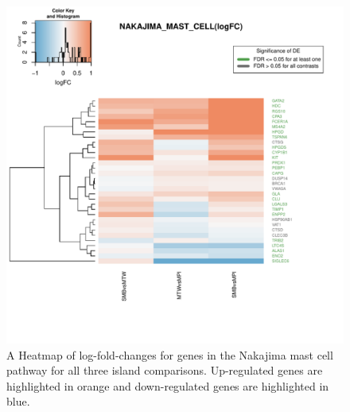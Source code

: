 \documentclass[12pt,a4paper,titlepage,twoside,openright]{book}
\begin{document}
\begin{mainmatter}
{{\begin{figure}[htb!]
\centering
\includegraphics[width=\textwidth,height=\textheight,keepaspectratio]{Figures/c2_ComparisonHeatmap_NAKAJIMA_MAST_CELL.pdf}
\caption{ A Heatmap of log-fold-changes for genes in the Nakajima mast cell pathway for all three island comparisons. Up-regulated genes are highlighted in orange and down-regulated genes are highlighted in blue.}
\label{fig:Nakajima Mast Cell}
\end{figure}


}}
\end{mainmatter}
\end{document}
